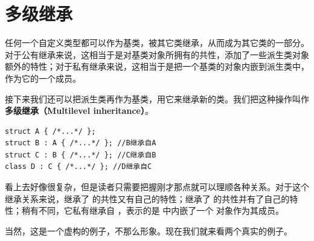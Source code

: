 \section{多级继承}
任何一个自定义类型都可以作为基类，被其它类继承，从而成为其它类的一部分。对于公有继承来说，这相当于是对基类对象所拥有的共性，添加了一些派生类对象额外的特性；对于私有继承来说，这相当于是把一个基类的对象内嵌到派生类中，作为它的一个成员。\par
接下来我们还可以把派生类再作为基类，用它来继承新的类。我们把这种操作叫作\textbf{多级继承（Multilevel inheritance）}。
\begin{lstlisting}
struct A { /*...*/ };
struct B : A { /*...*/ }; //B继承自A
struct C : B { /*...*/ }; //C继承自B
class D : C { /*...*/ }; //D继承自C
\end{lstlisting}
看上去好像很复杂，但是读者只需要把握刚才那点就可以理顺各种关系。对于这个继承关系来说，\lstinline@B@ 继承了 \lstinline@A@ 的共性又有自己的特性；\lstinline@C@ 继承了 \lstinline@B@ 的共性并有了自己的特性；\lstinline@D@ 稍有不同，它私有继承自 \lstinline@C@，表示的是 \lstinline@D@ 中内嵌了一个 \lstinline@C@ 对象作为其成员。\par
当然，这是一个虚构的例子，不那么形象。现在我们就来看两个真实的例子。\par
